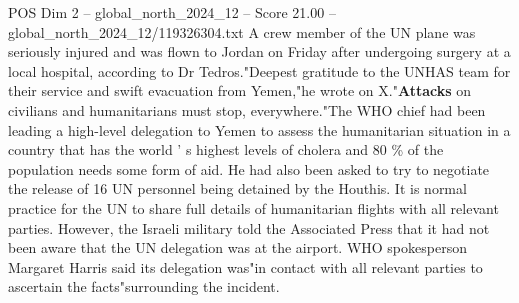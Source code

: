 \begin{textsample}{POS Dim 2 – global\_north\_2024\_12 – Score 21.00 – global\_north\_2024\_12/119326304.txt}
A crew member of the UN plane was seriously injured and was flown to Jordan on Friday after undergoing surgery at a local hospital, according to Dr Tedros."Deepest gratitude to the UNHAS team for their service and swift evacuation from Yemen,"he wrote on X."\textbf{Attacks} on civilians and humanitarians must stop, everywhere."The WHO chief had been leading a high-level delegation to Yemen to assess the humanitarian situation in a country that has the world ' s highest levels of cholera and 80 \% of the population needs some form of aid.
He had also been asked to try to negotiate the release of 16 UN personnel being detained by the Houthis.
It is normal practice for the UN to share full details of humanitarian flights with all relevant parties.
However, the Israeli military told the Associated Press that it had not been aware that the UN delegation was at the airport.
WHO spokesperson Margaret Harris said its delegation was"in contact with all relevant parties to ascertain the facts"surrounding the incident.

\end{textsample}

